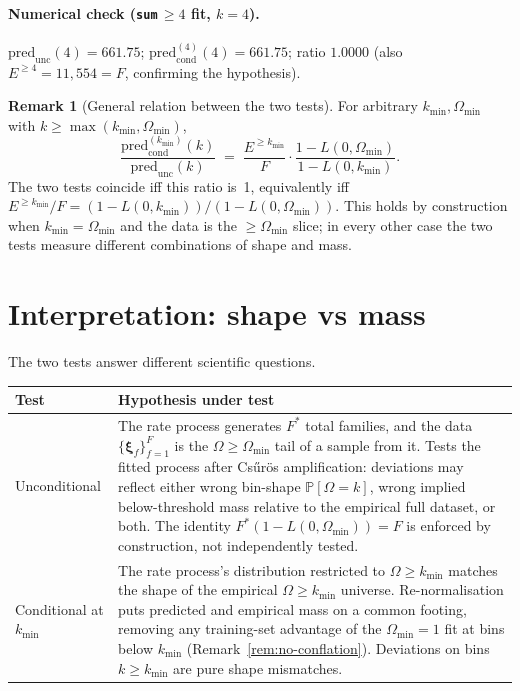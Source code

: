 \documentclass[11pt]{article}
\newcommand{\PROB}{\mathbb{P}}
\newcommand{\1}{\mathbf{1}}
\newcommand{\Prof}{\boldsymbol{\xi}}
\newcommand{\Om}{\Omega}
\theoremstyle{definition}
\newtheorem{remark}[theorem]{Remark}
\begin{document}
\paragraph{Numerical check (\texttt{sum}\,$\ge 4$ fit, $k=4$).}
$\mathrm{pred}_{\mathrm{unc}}(4) = 661.75$;
$\mathrm{pred}_{\mathrm{cond}}^{(4)}(4) = 661.75$; ratio $1.0000$
(also $E^{\ge 4} = 11{,}554 = F$, confirming the hypothesis).

\begin{remark}[General relation between the two tests]
For arbitrary $k_{\min}, \Om_{\min}$ with $k\ge\max(k_{\min}, \Om_{\min})$,
\begin{equation}
\frac{\mathrm{pred}_{\mathrm{cond}}^{(k_{\min})}(k)}{\mathrm{pred}_{\mathrm{unc}}(k)}
\;=\;
\frac{E^{\ge k_{\min}}}{F}
\cdot
\frac{1 - L(0, \Om_{\min})}{1 - L(0, k_{\min})}.
\label{eq:ratio-cond-uncond}
\end{equation}
The two tests coincide iff this ratio is~1, equivalently iff
$E^{\ge k_{\min}}/F = (1-L(0,k_{\min}))/(1-L(0,\Om_{\min}))$.
This holds by construction when $k_{\min} = \Om_{\min}$ and the
data is the $\ge\Om_{\min}$ slice; in every other case the two tests
measure different combinations of shape and mass.
\end{remark}

\section{Interpretation: shape vs mass}
\label{sec:interpret}

The two tests answer different scientific questions.

\medskip
\noindent\begin{tabular}{p{} p{}}
\toprule
\textbf{Test} & \textbf{Hypothesis under test} \\
\midrule
Unconditional & The rate process generates $F^*$ total families, and
the data $\{\Prof_f\}_{f=1}^F$ is the $\Om\ge\Om_{\min}$ tail of a
sample from it. Tests the fitted process after Cs\H{u}r\"os
amplification: deviations may reflect either wrong bin-shape
$\PROB[\Om=k]$, wrong implied below-threshold mass relative to the
empirical full dataset, or both. The identity
$F^*(1-L(0,\Om_{\min}))=F$ is enforced by construction, not
independently tested. \\[1.5ex]
Conditional at $k_{\min}$ & The rate process's distribution
restricted to $\Om\ge k_{\min}$ matches the shape of the empirical
$\Om\ge k_{\min}$ universe. Re-normalisation puts predicted and
empirical mass on a common footing, removing any training-set
advantage of the $\Om_{\min}=1$ fit at bins below $k_{\min}$
(Remark~\ref{rem:no-conflation}). Deviations on bins
$k\ge k_{\min}$ are pure shape mismatches. \\
\bottomrule
\end{tabular}
\end{document}
